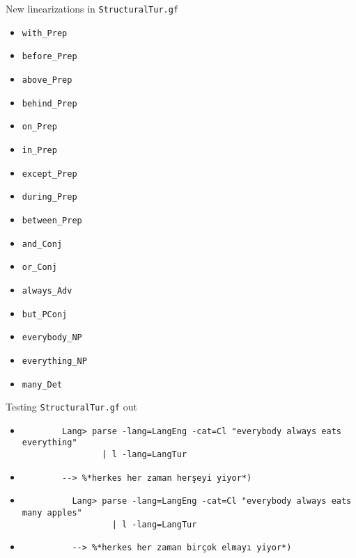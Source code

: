 \documentclass{beamer}
\begin{document}
  \begin{frame}{New linearizations in \texttt{StructuralTur.gf}}
    \scriptsize
    \begin{itemize}
      \item \texttt{with\_Prep}
      \item \texttt{before\_Prep}
      \item \texttt{above\_Prep}
      \item \texttt{behind\_Prep}
      \item \texttt{on\_Prep}
      \item \texttt{in\_Prep}
      \item \texttt{except\_Prep}
      \item \texttt{during\_Prep}
      \item \texttt{between\_Prep}
      \item \texttt{and\_Conj}
      \item \texttt{or\_Conj}
      \item \texttt{always\_Adv}
      \item \texttt{but\_PConj}
      \item \texttt{everybody\_NP}
      \item \texttt{everything\_NP}
      \item \texttt{many\_Det}
    \end{itemize}
    \normalsize
  \end{frame}

  \begin{frame}[fragile]{Testing \texttt{StructuralTur.gf} out}
    \begin{itemize}
      \item<1->
        \begin{lstlisting}
        Lang> parse -lang=LangEng -cat=Cl "everybody always eats everything"
                | l -lang=LangTur
        \end{lstlisting}
      \item<2->
        \begin{lstlisting}
        --> %*herkes her zaman herşeyi yiyor*)
        \end{lstlisting}
      \item<3->
        \begin{lstlisting}
          Lang> parse -lang=LangEng -cat=Cl "everybody always eats many apples"
                  | l -lang=LangTur
        \end{lstlisting}
      \item<4->
        \begin{lstlisting}
          --> %*herkes her zaman birçok elmayı yiyor*)
        \end{lstlisting}
    \end{itemize}
  \end{frame}
\end{document}
